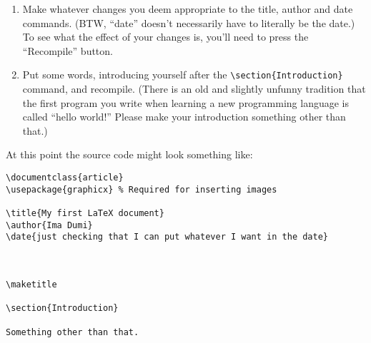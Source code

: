 \begin{enumerate}
You should see your document on the right side. It has a title section (which is 
what the \verb+\maketitle+ command created) and a section heading (this is what the \verb+\section{Introduction}+ command did). Scroll down to the bottom of the page and you
will see the number 1, the page number. Pages of articles are normally
numbered, so \LaTeX\  puts that in for you!  The area
between the \verb+\documentclass{article}+ and
the \verb++ tags is known
as the \textbf{preamble} of the \LaTeX\  document. 
You should see that the preamble contains some commands that effect how the title looks.  
The default stuff that Overleaf stuck in there probably isn't quite what you want.

Let's fix that!


\item Make whatever changes you deem appropriate to the title, author and date commands. (BTW, ``date'' doesn't necessarily have to literally be the date.)  To see what the effect of your changes is, you'll need to press the ``Recompile'' button.

\item Put some words, introducing yourself after the \verb+\section{Introduction}+ command, and recompile. (There is an old and slightly unfunny tradition that the first program you write when learning a new programming language is called ``hello world!''  Please make your introduction something other than that.)

\end{enumerate}

At this point the source code might look something like:
\bigskip

\begin{codeblock}
\begin{verbatim}
\documentclass{article}
\usepackage{graphicx} % Required for inserting images

\title{My first LaTeX document}
\author{Ima Dumi}
\date{just checking that I can put whatever I want in the date}



\maketitle

\section{Introduction}

Something other than that.


\end{verbatim}
\end{codeblock}

